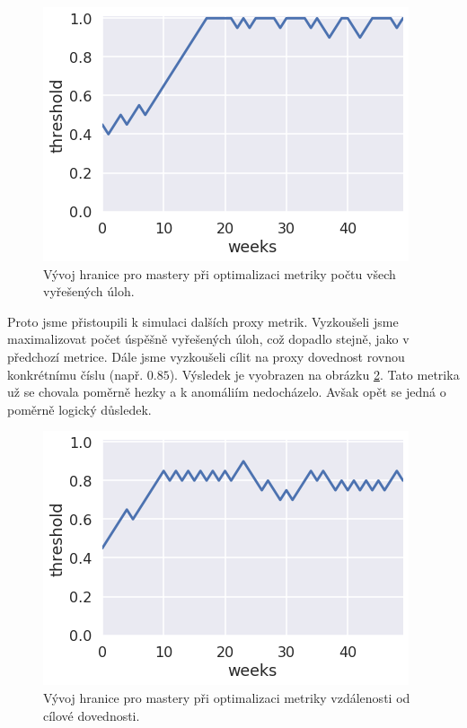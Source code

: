 \documentclass[twocolumn,10pt,cleanfoot]{asme2ej}
\begin{document}
\begin{figure}[htb]
\centering
\includegraphics[width=\columnwidth]{img/thresholds-solved-tasks}
\caption{Vývoj hranice pro mastery při optimalizaci metriky počtu všech vyřešených úloh.}
\label{fig:thresholds-solved-tasks}
\end{figure}


Proto jsme přistoupili k simulaci dalších proxy metrik. Vyzkoušeli jsme maximalizovat počet úspěšně vyřešených úloh, což dopadlo stejně, jako v předchozí metrice. Dále jsme vyzkoušeli cílit na proxy dovednost rovnou konkrétnímu číslu (např. $0.85$). Výsledek je vyobrazen na obrázku \ref{fig:thresholds-target-skill}.
Tato metrika už se chovala poměrně hezky a k anomáliím nedocházelo. Avšak opět se jedná o poměrně logický důsledek.

\begin{figure}[htb]
\centering
\includegraphics[width=\columnwidth]{img/thresholds-target-skill}
\caption{Vývoj hranice pro mastery při optimalizaci metriky vzdálenosti od cílové dovednosti.}
\label{fig:thresholds-target-skill}
\end{figure}
\end{document}
